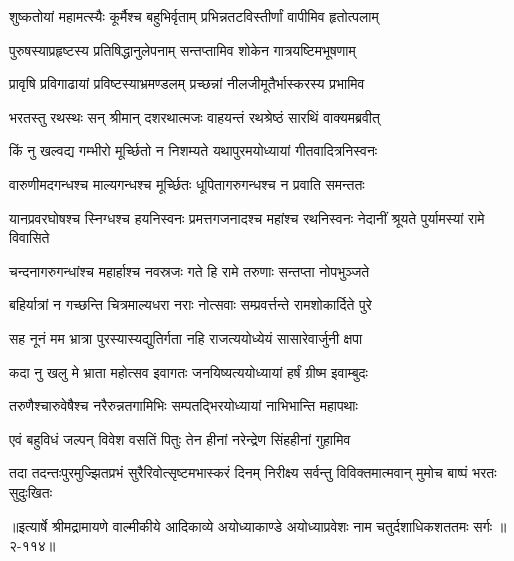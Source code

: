 \twolineshloka
{शुष्कतोयां महामत्स्यैः कूर्मैश्च बहुभिर्वृताम्}
{प्रभिन्नतटविस्तीर्णां वापीमिव हृतोत्पलाम्} %

\twolineshloka
{पुरुषस्याप्रहृष्टस्य प्रतिषिद्धानुलेपनाम्}
{सन्तप्तामिव शोकेन गात्रयष्टिमभूषणाम्} %

\twolineshloka
{प्रावृषि प्रविगाढायां प्रविष्टस्याभ्रमण्डलम्}
{प्रच्छन्नां नीलजीमूतैर्भास्करस्य प्रभामिव} %

\twolineshloka
{भरतस्तु रथस्थः सन् श्रीमान् दशरथात्मजः}
{वाहयन्तं रथश्रेष्ठं सारथिं वाक्यमब्रवीत्} %

\twolineshloka
{किं नु खल्वद्य गम्भीरो मूर्च्छितो न निशम्यते}
{यथापुरमयोध्यायां गीतवादित्रनिस्वनः} %

\twolineshloka
{वारुणीमदगन्धश्च माल्यगन्धश्च मूर्च्छितः}
{धूपितागरुगन्धश्च न प्रवाति समन्ततः} %

\threelineshloka
{यानप्रवरघोषश्च स्निग्धश्च हयनिस्वनः}
{प्रमत्तगजनादश्च महांश्च रथनिस्वनः}
{नेदानीं श्रूयते पुर्यामस्यां रामे विवासिते} %

\twolineshloka
{चन्दनागरुगन्धांश्च महार्हाश्च नवस्रजः}
{गते हि रामे तरुणाः सन्तप्ता नोपभुञ्जते} %

\twolineshloka
{बहिर्यात्रां न गच्छन्ति चित्रमाल्यधरा नराः}
{नोत्सवाः सम्प्रवर्त्तन्ते रामशोकार्दिते पुरे} %

\twolineshloka
{सह नूनं मम भ्रात्रा पुरस्यास्यद्युतिर्गता}
{नहि राजत्ययोध्येयं सासारेवार्जुनी क्षपा} %

\twolineshloka
{कदा नु खलु मे भ्राता महोत्सव इवागतः}
{जनयिष्यत्ययोध्यायां हर्षं ग्रीष्म इवाम्बुदः} %

\twolineshloka
{तरुणैश्चारुवेषैश्च नरैरुन्नतगामिभिः}
{सम्पतद्भिरयोध्यायां नाभिभान्ति महापथाः} %

\twolineshloka
{एवं बहुविधं जल्पन् विवेश वसतिं पितुः}
{तेन हीनां नरेन्द्रेण सिंहहीनां गुहामिव} %

\twolineshloka
{तदा तदन्तःपुरमुज्झितप्रभं सुरैरिवोत्सृष्टमभास्करं दिनम्}
{निरीक्ष्य सर्वन्तु विविक्तमात्मवान् मुमोच बाष्पं भरतः सुदुःखितः} %


॥इत्यार्षे श्रीमद्रामायणे वाल्मीकीये आदिकाव्ये अयोध्याकाण्डे अयोध्याप्रवेशः नाम चतुर्दशाधिकशततमः सर्गः ॥२-११४॥

